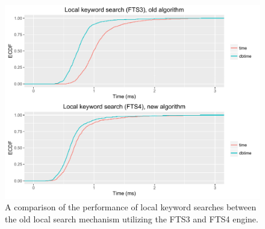 \begin{figure}[h!]
	\centering
	\includegraphics[width=1.0\columnwidth]{images/experiments/local_search_fts3_fts4}
	\caption{A comparison of the performance of local keyword searches between the old local search mechanism utilizing the FTS3 and FTS4 engine.}
	\label{fig:local-search-fts3-fts4}
\end{figure}

